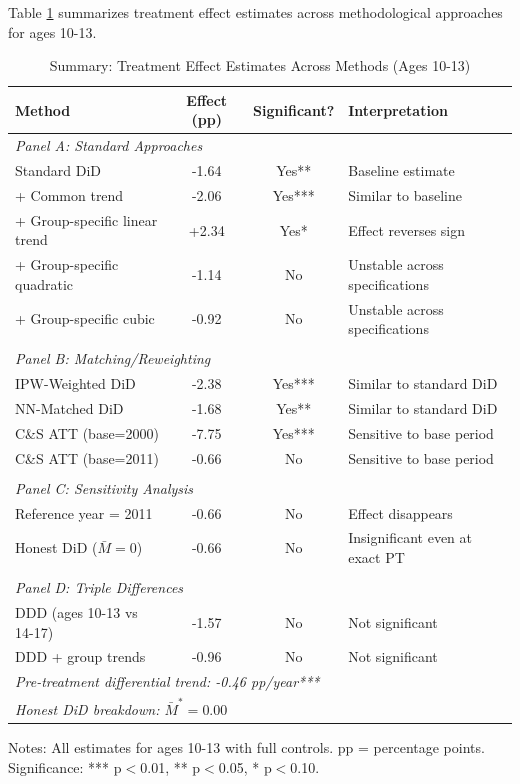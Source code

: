 Table \ref{tab:summary_methods} summarizes treatment effect estimates across methodological approaches for ages 10-13.

\begin{table}[H]
\centering
\caption{Summary: Treatment Effect Estimates Across Methods (Ages 10-13)}
\label{tab:summary_methods}
\begin{threeparttable}
\begin{tabular}{lccl}
\toprule
Method & Effect (pp) & Significant? & Interpretation \\
\midrule
\multicolumn{4}{l}{\textit{Panel A: Standard Approaches}} \\
Standard DiD & -1.64 & Yes** & Baseline estimate \\
+ Common trend & -2.06 & Yes*** & Similar to baseline \\
+ Group-specific linear trend & +2.34 & Yes* & Effect reverses sign \\
+ Group-specific quadratic & -1.14 & No & Unstable across specifications \\
+ Group-specific cubic & -0.92 & No & Unstable across specifications \\
\\
\multicolumn{4}{l}{\textit{Panel B: Matching/Reweighting}} \\
IPW-Weighted DiD & -2.38 & Yes*** & Similar to standard DiD \\
NN-Matched DiD & -1.68 & Yes** & Similar to standard DiD \\
C\&S ATT (base=2000) & -7.75 & Yes*** & Sensitive to base period \\
C\&S ATT (base=2011) & -0.66 & No & Sensitive to base period \\
\\
\multicolumn{4}{l}{\textit{Panel C: Sensitivity Analysis}} \\
Reference year = 2011 & -0.66 & No & Effect disappears \\
Honest DiD ($\bar{M}=0$) & -0.66 & No & Insignificant even at exact PT \\
\\
\multicolumn{4}{l}{\textit{Panel D: Triple Differences}} \\
DDD (ages 10-13 vs 14-17) & -1.57 & No & Not significant \\
DDD + group trends & -0.96 & No & Not significant \\
\midrule
\multicolumn{4}{l}{\textit{Pre-treatment differential trend: -0.46 pp/year***}} \\
\multicolumn{4}{l}{\textit{Honest DiD breakdown: $\bar{M}^* = 0.00$}} \\
\bottomrule
\end{tabular}
\begin{tablenotes}
\footnotesize
\item Notes: All estimates for ages 10-13 with full controls. pp = percentage points. Significance: *** p$<$0.01, ** p$<$0.05, * p$<$0.10.
\end{tablenotes}
\end{threeparttable}
\end{table}


